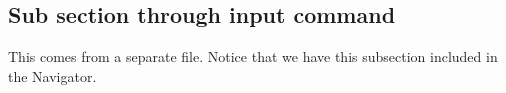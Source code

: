 \subsection{Sub section through input command}
This comes from a separate file. Notice that we have this subsection included in the Navigator. 